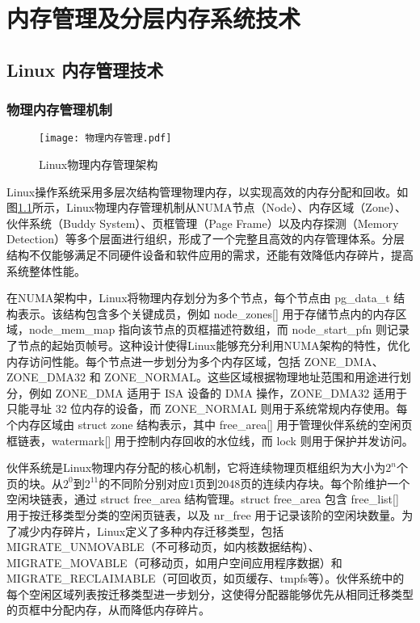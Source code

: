 \chapter{内存管理及分层内存系统技术}

\section{Linux 内存管理技术}

\subsection{物理内存管理机制}

\begin{figure}[h]
    \centering
    \texttt{[image: 物理内存管理.pdf]}
    \caption{Linux物理内存管理架构}
    \label{物理内存管理}
\end{figure}

Linux操作系统采用多层次结构管理物理内存，以实现高效的内存分配和回收。如图\ref{物理内存管理}所示，Linux物理内存管理机制从NUMA节点（Node）、内存区域（Zone）、伙伴系统（Buddy System）、页框管理（Page Frame）以及内存探测（Memory Detection）等多个层面进行组织，形成了一个完整且高效的内存管理体系。分层结构不仅能够满足不同硬件设备和软件应用的需求，还能有效降低内存碎片，提高系统整体性能。

在NUMA架构中，Linux将物理内存划分为多个节点，每个节点由 pg\_data\_t 结构表示。该结构包含多个关键成员，例如 node\_zones[] 用于存储节点内的内存区域，node\_mem\_map 指向该节点的页框描述符数组，而 node\_start\_pfn 则记录了节点的起始页帧号。这种设计使得Linux能够充分利用NUMA架构的特性，优化内存访问性能。每个节点进一步划分为多个内存区域，包括 ZONE\_DMA、ZONE\_DMA32 和 ZONE\_NORMAL。这些区域根据物理地址范围和用途进行划分，例如 ZONE\_DMA 适用于 ISA 设备的 DMA 操作，ZONE\_DMA32 适用于只能寻址 32 位内存的设备，而 ZONE\_NORMAL 则用于系统常规内存使用。每个内存区域由 struct zone 结构表示，其中 free\_area[] 用于管理伙伴系统的空闲页框链表，watermark[] 用于控制内存回收的水位线，而 lock 则用于保护并发访问。

伙伴系统是Linux物理内存分配的核心机制，它将连续物理页框组织为大小为\(2^n\)个页的块。从\(2^0\)到\(2^{11}\)的不同阶分别对应1页到2048页的连续内存块。每个阶维护一个空闲块链表，通过 struct free\_area 结构管理。struct free\_area 包含 free\_list[] 用于按迁移类型分类的空闲页链表，以及 nr\_free 用于记录该阶的空闲块数量。为了减少内存碎片，Linux定义了多种内存迁移类型，包括 MIGRATE\_UNMOVABLE（不可移动页，如内核数据结构）、MIGRATE\_MOVABLE（可移动页，如用户空间应用程序数据）和 MIGRATE\_RECLAIMABLE（可回收页，如页缓存、tmpfs等）。伙伴系统中的每个空闲区域列表按迁移类型进一步划分，这使得分配器能够优先从相同迁移类型的页框中分配内存，从而降低内存碎片。

